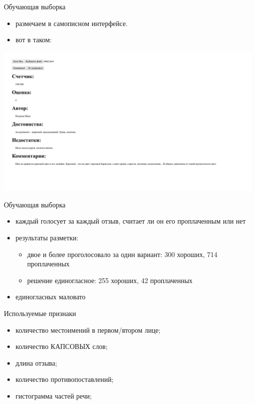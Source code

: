 \documentclass[mathserif,utf8,14pt]{beamer}
\begin{document}
\begin{frame}{Обучающая выборка}
\begin{itemize}
         \item размечаем в самописном интерфейсе.
         \item вот в таком:
     \end{itemize}
     \includegraphics[width=\linewidth]{labeling_interface.png}
\end{frame}

\begin{frame}{Обучающая выборка}
     \begin{itemize}
	 \item каждый голосует за каждый отзыв, считает ли он его проплаченным или нет
         \item результаты разметки:
	 \begin{itemize}	
              \item двое и более проголосовало за один вариант: 300 хороших, 714 проплаченных
              \item решение единогласное: 255 хороших, 42 проплаченных
 	 \end{itemize}
	 \item единогласных маловато
     \end{itemize}
\end{frame}

\begin{frame}{Используемые признаки}
    \begin{itemize}
        \item количество местоимений в первом/втором лице;
        \item количество КАПСОВЫХ слов;
        \item длина отзыва;
        \item количество противопоставлений;
        \item гистограмма частей речи;
    \end{itemize}
\end{frame}
\end{document}
